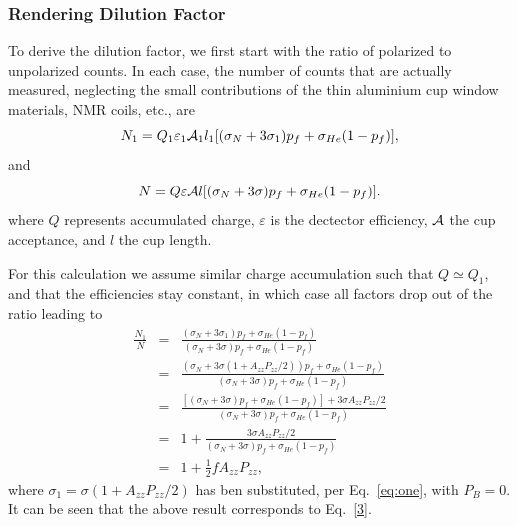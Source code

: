\subsubsection{Rendering Dilution Factor}
\label{dil}
To derive the dilution factor, we first start with the ratio of 
polarized to unpolarized counts.
In each case, the number of counts that are actually measured,  neglecting 
the small contributions of the thin aluminium cup window materials, NMR coils, etc.,
are
\begin{equation}
N_1=Q_1\varepsilon_1 {\cal A}_1 l_1[(\sigma_N+3\sigma_1)p_f+\sigma_{He}(1-p_f)],
\end{equation}
and
\begin{equation}
N=Q\varepsilon {\cal A}l[(\sigma_N+3\sigma)p_f+\sigma_{He}(1-p_f)].
\end{equation}
where $Q$ represents accumulated charge, $\varepsilon$ is the dectector 
efficiency, ${\cal A}$ the cup acceptance, and $l$ the cup length.  

For
this calculation we assume similar charge accumulation such that $Q\simeq Q_1$, 
and that the efficiencies stay constant, in which case all factors drop out of 
the ratio leading to
\begin{eqnarray}
\nonumber \frac{N_1}{N}& = &\frac{{(\sigma_N+3\sigma_1)p_f+\sigma_{He}(1-p_f)}
}{(\sigma_N+3\sigma)p_f+\sigma_{He}(1-p_f)}\\
\nonumber & = & \frac{{(\sigma_N+3\sigma(1+A_{zz}P_{zz}/2))p_f+\sigma_{He}(1-p_
f)}}{(\sigma_N+3\sigma)p_f+\sigma_{He}(1-p_f)}\\
\nonumber & = & \frac{{[(\sigma_N+3\sigma)p_f+\sigma_{He}(1-p_
f)]+3\sigma A_{zz}P_{zz}/2}}{(\sigma_N+3\sigma)p_f+\sigma_{He}(1-p_f)}\\
\nonumber & = & 1 + \frac{3\sigma 
A_{zz}P_{zz}/2}{(\sigma_N+3\sigma)p_f+\sigma_{He}(1-p_f)}\\
& = & 1 + \frac{1}{2} f A_{zz}P_{zz}, 
\end{eqnarray}
where $\sigma_1 = \sigma(1+A_{zz}P_{zz}/2)$ has ben substituted, per 
Eq.~\ref{eq:one}, with $P_B =0$. It can be seen that the above result 
corresponds to Eq.~\ref{3}.
